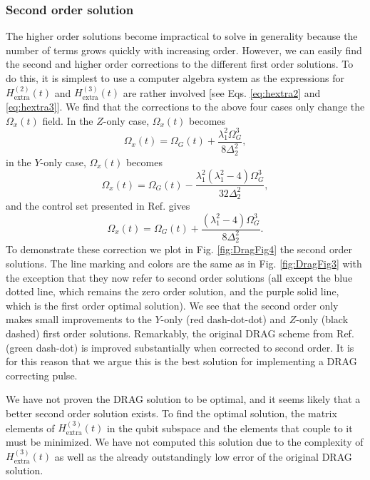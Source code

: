 \documentclass[pra,twocolumn,floatfix,superscriptaddress,eqsecnum]{revtex4-1}
\begin{document}
\subsubsection{Second order solution}

The higher order solutions become impractical to solve in generality because the number of terms grows quickly with increasing order.  However, we can easily find the second and higher order corrections to the different first order solutions.  To do this, it is simplest to use a computer algebra system as the expressions for $H_\mathrm{extra}^{(2)}(t)$ and $H_\mathrm{extra}^{(3)}(t)$ are rather involved [see Eqs. \eqref{eq:hextra2} and \eqref{eq:hextra3}]. We find that
the corrections to the above four cases only change the $\Omega_{x}(t)$ field. In the $Z$-only case,  $\Omega_{x}(t)$ becomes
\begin{equation}
\Omega_{x}(t) =   \Omega_G(t) +\frac{\lambda_1^2\Omega_G^3}{8\Delta_2^2},
\end{equation} in the $Y$-only case, $\Omega_{x}(t)$ becomes
\begin{equation}
\Omega_{x}(t) =   \Omega_G(t) - \frac{\lambda_1^2(\lambda_1^2-4)\Omega_G^3}{32\Delta_2^2},
\end{equation} and the control set presented in Ref. \cite{Motzoi2009} gives
\begin{equation}
\Omega_{x}(t) =   \Omega_G(t) + \frac{(\lambda_1^2-4)\Omega_G^3}{8\Delta_2^2}.
\end{equation} To demonstrate these correction we plot in Fig. \ref{fig:DragFig4} the second order solutions. The line marking and colors are the same as in Fig. \ref{fig:DragFig3} with the exception that they now refer to second order solutions (all except the blue dotted line, which remains the zero order solution, and the purple solid line, which is the first order optimal solution). We see that the second order only makes small improvements to the $Y$-only (red dash-dot-dot) and $Z$-only (black dashed) first order solutions. Remarkably, the original DRAG scheme from Ref. \cite{Motzoi2009} (green dash-dot) is improved substantially when corrected to second order. It is for this reason that we argue this is the best solution for implementing a DRAG correcting pulse. 

We have not proven the DRAG solution to be optimal, and it seems likely that a better second order solution exists. To find the optimal solution, the matrix elements of $H_\mathrm{extra}^{(3)}(t)$ in the qubit subspace and the elements that couple to it must be minimized.  We have not computed this solution due to the complexity of $H_\mathrm{extra}^{(3)}(t)$ as well as the already outstandingly low error of the original DRAG solution.     
\end{document}
